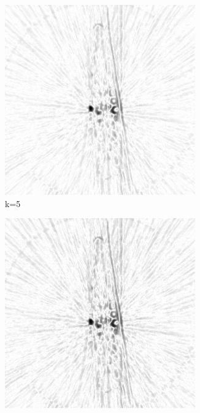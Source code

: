 \documentclass[journal]{IEEEtran}
\begin{document}
\begin{figure}[h]
    \begin{subfigure}[b]{0.24\linewidth}
        \includegraphics[width=\textwidth]{../images/okra/post_TCI/2D/48_views/tuning_k/weightsIm_kk_5_lambda_prior_0.700000.png}
        \caption{k=5}
     \end{subfigure}     
  \begin{subfigure}[b]{0.24\linewidth}
        \includegraphics[width=\textwidth]{../images/okra/post_TCI/2D/48_views/tuning_k/weightsIm_kk_10_lambda_prior_0.700000.png}

\end{subfigure}
\end{figure}
\end{document}
